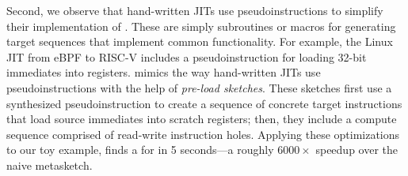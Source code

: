 Second, we observe that hand-written JITs use pseudoinstructions to simplify
their implementation of \minicompilers. These are simply subroutines or macros
for generating target sequences that implement common functionality. For
example, the Linux JIT from eBPF to RISC-V includes a pseudoinstruction for
loading 32-bit immediates into registers. \jitsynth mimics the way hand-written
JITs use pseudoinstructions with the help of \emph{pre-load sketches}. These
sketches first use a synthesized pseudoinstruction to create a sequence of
concrete target instructions that load source immediates into scratch registers;
then, they include a compute sequence comprised of read-write instruction holes.
Applying these optimizations to our toy example, \jitsynth finds a \minicompiler
for  in {5 seconds}---a {roughly $6000\times$} speedup over the naive
metasketch.\tighten
